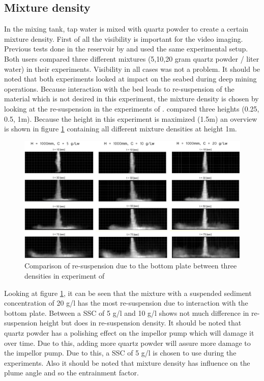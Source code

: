 \subsection{Mixture density}
In the mixing tank, tap water is mixed with quartz powder to create a certain mixture density. First of all the visibility is important for the video imaging. Previous tests done in the reservoir by \cite{Warringa} and \cite{Byishimo} used the same experimental setup. Both users compared three different mixtures (5,10,20 gram quartz powder / liter water) in their experiments. Visibility in all cases was not a problem. It should be noted that both experiments looked at impact on the seabed during deep mining operations. Because interaction with the bed leads to re-suspension of the material which is not desired in this experiment, the mixture density is chosen by looking at the re-suspension in the experiments of \cite{Warringa}. \cite{Warringa} compared three heights (0.25, 0.5, 1m). Because the height in this experiment is maximized (1.5m) an overview is shown in figure \ref{fig:Warringa_gl} containing all different mixture densities at height 1m.

\begin{figure}[ht!]
    \centering
    \includegraphics[width=1\textwidth]{Images/Warringa_gl.png}
    \caption{Comparison of re-suspension due to the bottom plate between three densities in experiment of \cite{Warringa}}
    \label{fig:Warringa_gl}
\end{figure}


\noindent Looking at figure \ref{fig:Warringa_gl}, it can be seen that the mixture with a suspended sediment concentration of 20 g/l has the most re-suspension due to interaction with the bottom plate. Between a SSC of 5 g/l and 10 g/l shows not much difference in re-suspension height but does in re-suspension density. It should be noted that quartz powder has a polishing effect on the impellor pump which will damage it over time. Due to this, adding more quartz powder will assure more damage to the impellor pump. Due to this, a SSC of 5 g/l is chosen to use during the experiments. Also it should be noted that mixture density has influence on the plume angle and so the entrainment factor.  \newline

